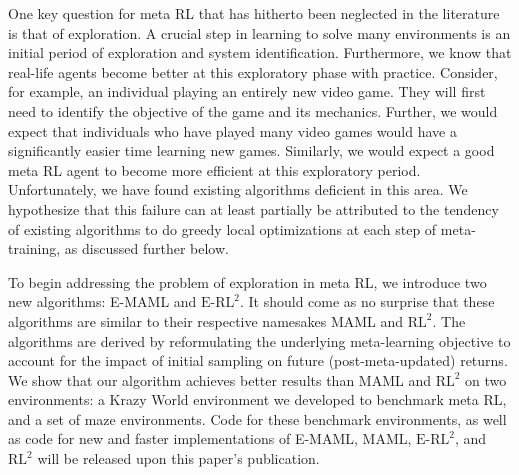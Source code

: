 \documentclass{article} %
\begin{document}
One key question for meta RL that has hitherto been neglected in the literature is that of exploration. A crucial step in learning to solve many environments is an initial period of exploration and system identification. Furthermore, we know that real-life agents become better at this exploratory phase with practice. Consider, for example, an individual playing an entirely new video game. They will first need to identify the objective of the game and its mechanics. Further, we would expect that individuals who have played many video games would have a significantly easier time learning new games. Similarly, we would expect a good meta RL agent to become more efficient at this exploratory period. Unfortunately, we have found existing algorithms deficient in this area. We hypothesize that this failure can at least partially be attributed to the tendency of existing algorithms to do greedy local optimizations at each step of meta-training, as discussed further below. 

To begin addressing the problem of exploration in meta RL, we introduce two new algorithms: E-MAML and $\text{E-RL}^2$. It should come as no surprise that these algorithms are similar to their respective namesakes MAML and $\text{RL}^2$. The algorithms are derived by reformulating the underlying meta-learning objective to account for the impact of initial sampling on future (post-meta-updated) returns. We show that our algorithm achieves better results than MAML and $\text{RL}^2$ on two environments: a Krazy World environment we developed to benchmark meta RL, and a set of maze environments. Code for these benchmark environments, as well as code for new and faster implementations of E-MAML, MAML, $\text{E-RL}^2$, and $\text{RL}^2$ will be released upon this paper's publication. 

\end{document}
